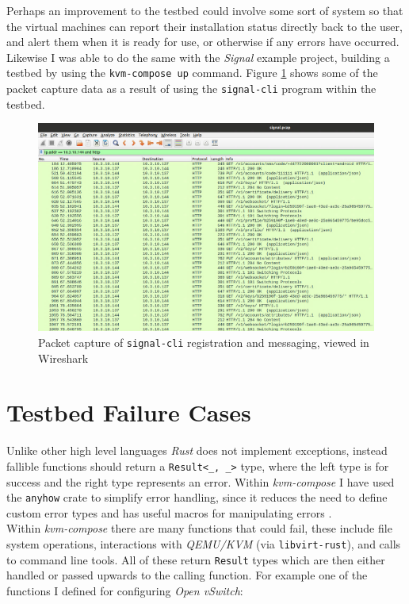 \documentclass[
    author={Jacob Daniel Halsey},
    supervisor={Prof. Awais Rashid},
    degree={BSc},
    title={Building a Testbed for Evaluating Privacy Enhancing Technologies  (PETs)},
    subtitle={},
    type={software development},
    year={2021}
]{dissertation}
\begin{document}
Perhaps an improvement to the testbed could
involve some sort of system so that the virtual machines can report their installation status
directly back to the user, and alert them when it is ready for use, or otherwise if any errors have occurred. \\

Likewise I was able to do the same with the \emph{Signal} example project, building a testbed by using the
\texttt{kvm-compose up} command. Figure \ref{fig:signal_capture} shows some of the packet capture data
as a result of using the \texttt{signal-cli} program within the testbed.

\begin{figure}
	\centering
	\includegraphics[width=16cm]{img/signal_capture}
	\caption{Packet capture of \texttt{signal-cli} registration and messaging, viewed in Wireshark}
	\label{fig:signal_capture}
\end{figure}

\section{Testbed Failure Cases}

Unlike other high level languages \emph{Rust} does not implement exceptions, instead fallible
functions should return a \lstinline|Result<_, _>| type, where the left type is for success
and the right type represents an error. Within \emph{kvm-compose} I have used the \texttt{anyhow} 
crate to simplify error handling, since it reduces the need to define custom error types
and has useful macros for manipulating errors \cite{groenen}. \\

Within \emph{kvm-compose} there are many functions that could fail, these include file system
operations, interactions with \emph{QEMU/KVM} (via \texttt{libvirt-rust}), and calls to command
line tools. All of these return \lstinline|Result| types which are then either handled
or passed upwards to the calling function. For example one of the functions I defined for 
configuring \emph{Open vSwitch}: \\
\end{document}
